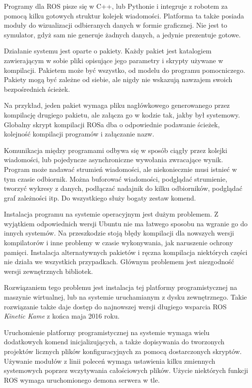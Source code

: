 	Programy dla ROS pisze się w C++, lub Pythonie i integruje z robotem za pomocą kilku gotowych struktur kolejek wiadomości.
	Platforma ta także posiada moduły do wizualizacji odbieranych danych w formie graficznej.
	Nie jest to symulator, gdyż sam nie generuje żadnych danych, a jedynie prezentuje gotowe.

	Działanie systemu jest oparte o pakiety. Każdy pakiet jest katalogiem zawierającym w sobie pliki opisujące jego parametry i skrypty używane w kompilacji.
	Pakietem może być wszystko, od modelu do programu pomocniczego.
	Pakiety mogą być zależne od siebie, ale nigdy nie wskazują nawzajem swoich bezpośrednich ścieżek.

	Na przykład, jeden pakiet wymaga pliku nagłówkowego generowanego przez kompilację drugiego pakietu, ale załącza go w kodzie tak, jakby był systemowy.
	Globalny skrypt kompilacji ROSa dba o odpowiednie podawanie ścieżek, kolejność kompilacji programów i załączanie nazw.

	Komunikacja między programami odbywa się w sposób ciągły przez kolejki wiadomości, lub pojedyncze asynchroniczne wywołania zwracające wynik.
	Program może nadawać strumień wiadomości, ale niekoniecznie musi istnieć w tym czasie odbiornik.
	Można buforować wiadomości, podglądać strumienie, tworzyć wykresy z danych, podłączać nadajnik do kilku odbiorników, podglądać graf zależności itp.
	Do wszystkiego służy bogaty zestaw komend.

	Instalacja programu na systemie operacyjnym jest dużym problemem.
	Z wyjątkiem odpowiednich wersji Ubuntu nie ma łatwego sposobu na wgranie go do innych systemów.
	Na przeszkodzie stoją błędy kompilacji dla nowszych wersji kompilatorów i inne problemy w czasie wykonywania, jak naruszenie ochrony pamięci. 
	Instalacja alternatywnych pakietów i ręczna kompilacja niektórych części nie działa we wszystkich przypadkach.
	Głównym problemem jest niezgodność wersji zewnętrznych bibliotek.

	Rozwiązaniem tego problemu jest instalacja tej platformy programistycznej na maszynie wirtualnej, lub na systemie uruchamianym z dysku zewnętrznego. 
	Takie rozwiązanie także daje dostęp do najnowszej wersji długiego wsparcia ROS \emph{Kinetic Kame} z końca maja 2016 roku.

	Uruchomienie platformy programistycznej na systemie wymaga wielu dodatkowych komend inicjalizujących, a także dopisywania do tworzonych projektów licznych plików konfiguracyjnych za pomocą dostarczonych skryptów.
	Używanie modułów z linii poleceń wymaga ustawienia kilku zmiennych systemowych poprzez wczytywania całościowych plików.
	Użycie niektórych funkcji ROS wymaga uruchomionego demona serwera w tle.

